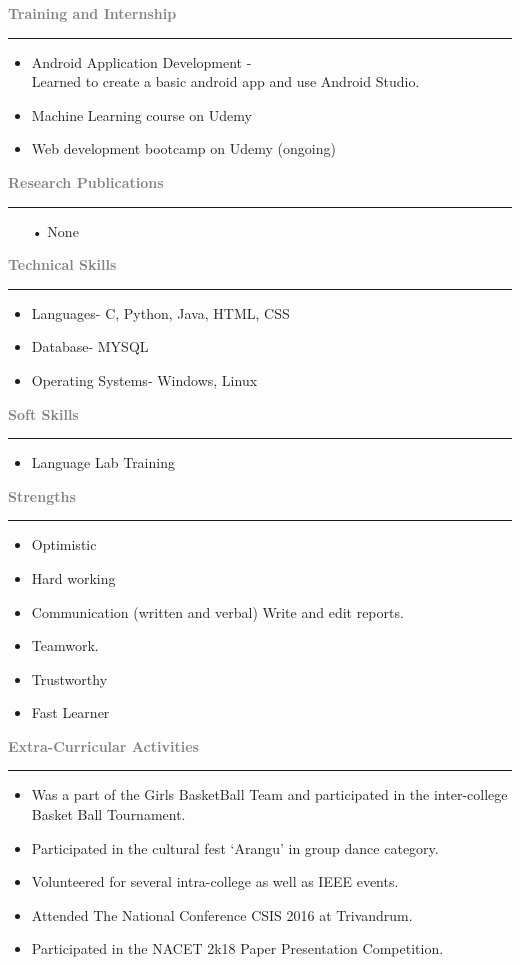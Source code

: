 \documentclass[11.5pt,a4paper]{article}
\begin{document}
\textbf{\textcolor{gray}{\huge Training and Internship}}\hrule
\begin{itemize}
\item Android Application Development -\\
Learned to create a basic android app and use Android Studio.
\item Machine Learning course on Udemy
\item Web development bootcamp on Udemy (ongoing)
\end{itemize}

\textbf{\textcolor{gray}{\huge Research Publications}}\\ \hrule
\begin{itemize}
\item[•]None
\end{itemize}


\textbf{\textcolor{gray}{\huge Technical Skills}}\\ \hrule
\begin{itemize}
\item Languages- C, Python, Java, HTML, CSS
\item Database- MYSQL
\item Operating Systems- Windows, Linux
\end{itemize}

\textbf{\textcolor{gray}{\huge Soft Skills}}\\ \hrule
\begin{itemize}
\item Language Lab Training 
\end{itemize}

\textbf{\textcolor{gray}{\huge Strengths}}\\ \hrule
\begin{itemize}
\item Optimistic
\item Hard working
\item Communication (written and verbal) Write and edit reports.
\item Teamwork.
\item Trustworthy 
\item Fast Learner

\end{itemize}

\textbf{\textcolor{gray}{\huge Extra-Curricular Activities}}\\  \hrule
\begin{itemize}
\item Was a part of the Girls BasketBall Team and participated in the inter-college Basket Ball Tournament.
\item Participated in the cultural fest ‘Arangu’ in group dance category.
\item Volunteered for several intra-college as well as IEEE events.
\item Attended The National Conference CSIS  2016 at Trivandrum.
\item Participated in the NACET 2k18 Paper Presentation Competition.

\end{itemize}
\end{document}
